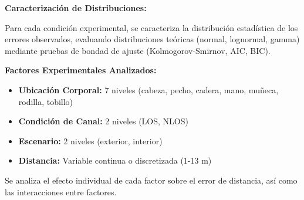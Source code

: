 \textbf{Caracterización de Distribuciones:}

Para cada condición experimental, se caracteriza la distribución estadística de los errores observados, evaluando distribuciones teóricas (normal, lognormal, gamma) mediante pruebas de bondad de ajuste (Kolmogorov-Smirnov, AIC, BIC).

\textbf{Factores Experimentales Analizados:}
\begin{itemize}
\item \textbf{Ubicación Corporal:} 7 niveles (cabeza, pecho, cadera, mano, muñeca, rodilla, tobillo)
\item \textbf{Condición de Canal:} 2 niveles (LOS, NLOS)
\item \textbf{Escenario:} 2 niveles (exterior, interior)
\item \textbf{Distancia:} Variable continua o discretizada (1-13 m)
\end{itemize}

Se analiza el efecto individual de cada factor sobre el error de distancia, así como las interacciones entre factores.
